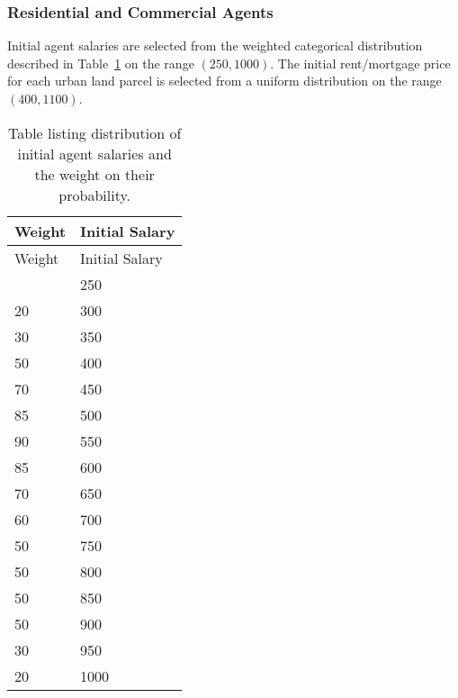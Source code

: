 \subsubsection*{Residential and Commercial Agents}

Initial agent salaries are selected from the weighted categorical distribution described in
Table~\ref{tab:sals} on the range $\left(250, 1000\right)$.
The initial rent/mortgage price for each urban land parcel is selected from a uniform distribution
on the range $\left(400, 1100\right)$.

\begin{longtable}{ll}
\caption{Table listing distribution of initial agent salaries and the weight on their probability.}\label{tab:sals}\\
\hline\hline
Weight & Initial Salary \\
\hline\endfirsthead
\hline\hline
Weight & Initial Salary \\
\hline\endhead
\hline\endfoot
    10 & 250 \\
    20 & 300 \\
    30 & 350 \\
    50 & 400 \\
    70 & 450 \\
    85 & 500 \\
    90 & 550 \\
    85 & 600 \\
    70 & 650 \\
    60 & 700 \\
    50 & 750 \\
    50 & 800 \\
    50 & 850 \\
    50 & 900 \\
    30 & 950 \\
    20 & 1000 \\
\end{longtable}